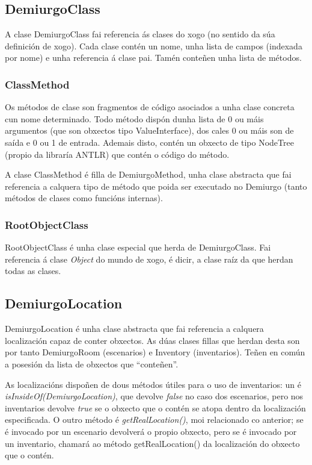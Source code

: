 \subsection{DemiurgoClass}
A clase DemiurgoClass fai referencia ás clases do xogo (no sentido da súa
definición de xogo). Cada clase contén un nome, unha lista de campos (indexada
por nome) e unha referencia á clase pai. Tamén conteñen unha lista de métodos.

\subsubsection{ClassMethod}
Os métodos de clase son fragmentos de código asociados a unha clase concreta cun
nome determinado. Todo método dispón dunha lista de 0 ou máis argumentos (que
son obxectos tipo ValueInterface), dos cales 0 ou máis son de saída e 0 ou 1 de
entrada. Ademais disto, contén un obxecto de tipo NodeTree (propio da libraría
ANTLR) que contén o código do método.
\par
A clase ClassMethod é filla de DemiurgoMethod, unha clase abstracta que fai
referencia a calquera tipo de método que poida ser executado no Demiurgo (tanto
métodos de clases como funcións internas).

\subsubsection{RootObjectClass}
RootObjectClass é unha clase especial que herda de DemiurgoClass. Fai referencia
á clase \textit{Object} do mundo de xogo, é dicir, a clase raíz da que herdan
todas as clases.

\subsection{DemiurgoLocation}
DemiurgoLocation é unha clase abstracta que fai referencia a calquera
localización capaz de conter obxectos. As dúas clases fillas que herdan desta
son por tanto DemiurgoRoom (escenarios) e Inventory (inventarios). Teñen en
común a posesión da lista de obxectos que ``conteñen''.
\par
As localizacións dispoñen de dous métodos útiles para o uso de inventarios: un é
\textit{isInsideOf(DemiurgoLocation)}, que devolve \textit{false} no caso dos
escenarios, pero nos inventarios devolve \textit{true} se o obxecto que o contén
se atopa dentro da localización especificada. O outro método é
\textit{getRealLocation()}, moi relacionado co anterior; se é invocado por un
escenario devolverá o propio obxecto, pero se é invocado por un inventario,
chamará ao método getRealLocation() da localización do obxecto que o contén.

